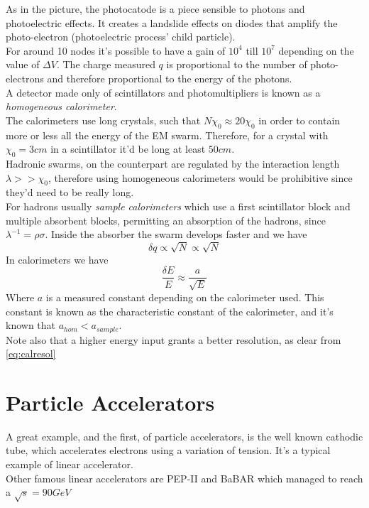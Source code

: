 \documentclass[../qm.tex]{subfiles}
\begin{document}
As in the picture, the photocatode is a piece sensible to photons and photoelectric effects. It creates a landslide effects on diodes that amplify the photo-electron (photoelectric process' child particle).\\
For around 10 nodes it's possible to have a gain of $10^4$ till $10^7$ depending on the value of $\Delta V$. The charge measured $q$ is proportional to the number of photo-electrons and therefore proportional to the energy of the photons.\\
A detector made only of scintillators and photomultipliers is known as a \emph{homogeneous calorimeter}.\\
The calorimeters use long crystals, such that $N\chi_0\approx20\chi_0$ in order to contain more or less all the energy of the EM swarm. Therefore, for a crystal with $\chi_0=3\unit{cm}$ in a scintillator it'd be long at least $50\unit{cm}$.\\
Hadronic swarms, on the counterpart are regulated by the interaction length $\lambda>>\chi_0$, therefore using homogeneous calorimeters would be prohibitive since they'd need to be really long.\\
For hadrons usually \emph{sample calorimeters} which use a first scintillator block and multiple absorbent blocks, permitting an absorption of the hadrons, since $\lambda^{-1}=\rho\sigma$. Inside the absorber the swarm develops faster and we have
\begin{equation*}
	\delta q\propto\sqrt{N}\propto\sqrt{N}
\end{equation*}
In calorimeters we have
\begin{equation}
	\frac{\delta E}{E}\approx\frac{a}{\sqrt{E}}
	\label{eq:calresol}
\end{equation}
Where $a$ is a measured constant depending on the calorimeter used. This constant is known as the characteristic constant of the calorimeter, and it's known that $a_{hom}<a_{sample}$.\\
Note also that a higher energy input grants a better resolution, as clear from \eqref{eq:calresol}
\section{Particle Accelerators}
A great example, and the first, of particle accelerators, is the well known cathodic tube, which accelerates electrons using a variation of tension. It's a typical example of linear accelerator.\\
Other famous linear accelerators are PEP-II and BaBAR which managed to reach a $\sqrt{s}=90\unit{GeV}$
\end{document}
